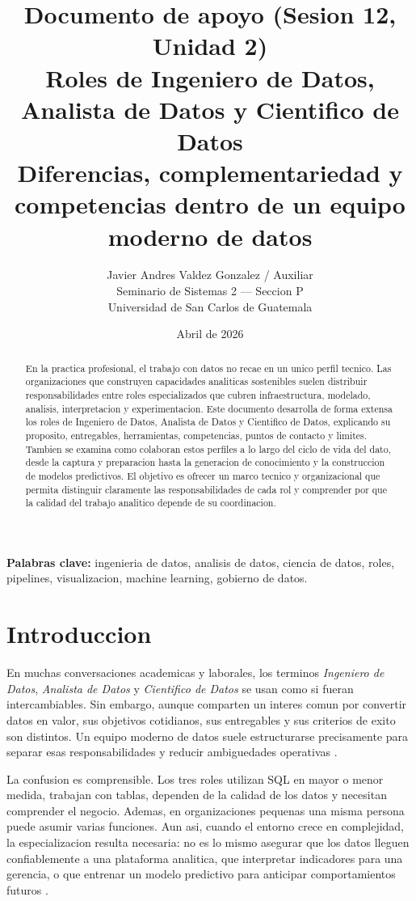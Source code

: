 \documentclass[12pt]{article}
\title{\textbf{Documento de apoyo (Sesion 12, Unidad 2)}\\
\large Roles de Ingeniero de Datos, Analista de Datos y Cientifico de Datos\\
\normalsize Diferencias, complementariedad y competencias dentro de un equipo moderno de datos}
\author{Javier Andres Valdez Gonzalez / Auxiliar \\
\small Seminario de Sistemas 2 --- Seccion P \\
\small Universidad de San Carlos de Guatemala}
\date{Abril de 2026}
\begin{document}
\maketitle

\begin{abstract}
En la practica profesional, el trabajo con datos no recae en un unico perfil tecnico. Las organizaciones que construyen capacidades analiticas sostenibles suelen distribuir responsabilidades entre roles especializados que cubren infraestructura, modelado, analisis, interpretacion y experimentacion. Este documento desarrolla de forma extensa los roles de Ingeniero de Datos, Analista de Datos y Cientifico de Datos, explicando su proposito, entregables, herramientas, competencias, puntos de contacto y limites. Tambien se examina como colaboran estos perfiles a lo largo del ciclo de vida del dato, desde la captura y preparacion hasta la generacion de conocimiento y la construccion de modelos predictivos. El objetivo es ofrecer un marco tecnico y organizacional que permita distinguir claramente las responsabilidades de cada rol y comprender por que la calidad del trabajo analitico depende de su coordinacion.
\end{abstract}

\textbf{Palabras clave:} ingenieria de datos, analisis de datos, ciencia de datos, roles, pipelines, visualizacion, machine learning, gobierno de datos.

\newpage
\tableofcontents

\section{Introduccion}
En muchas conversaciones academicas y laborales, los terminos \textit{Ingeniero de Datos}, \textit{Analista de Datos} y \textit{Cientifico de Datos} se usan como si fueran intercambiables. Sin embargo, aunque comparten un interes comun por convertir datos en valor, sus objetivos cotidianos, sus entregables y sus criterios de exito son distintos. Un equipo moderno de datos suele estructurarse precisamente para separar esas responsabilidades y reducir ambiguedades operativas \cite{ibm_modern_team,ibm_roles}.

La confusion es comprensible. Los tres roles utilizan SQL en mayor o menor medida, trabajan con tablas, dependen de la calidad de los datos y necesitan comprender el negocio. Ademas, en organizaciones pequenas una misma persona puede asumir varias funciones. Aun asi, cuando el entorno crece en complejidad, la especializacion resulta necesaria: no es lo mismo asegurar que los datos lleguen confiablemente a una plataforma analitica, que interpretar indicadores para una gerencia, o que entrenar un modelo predictivo para anticipar comportamientos futuros \cite{aws_analytics,aws_data_science}.
\end{document}

